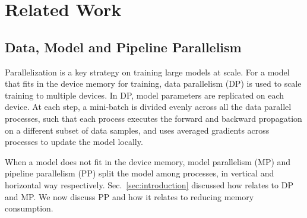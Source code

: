 \section{Related Work}
\label{sec:related-work}
\subsection{Data, Model and Pipeline Parallelism}
Parallelization is a key strategy on training large models at scale. For a model that fits in the device memory for training, data parallelism (DP) is used to scale training to multiple devices. In DP, model parameters are replicated on each device. At each step, a mini-batch is divided evenly across all the data parallel processes, such that each process executes the forward and backward propagation on a different subset of data samples, and uses averaged gradients across processes to update the model locally.  

When a model does not fit in the device memory, model parallelism (MP) \cite{DBLP:journals/corr/mesh-tensor, megatronlm} and pipeline parallelism (PP) \cite{GPipe, DBLP:journals/corr/pipedream} split the model among processes, in vertical and horizontal way respectively. Sec.~\ref{sec:introduction} discussed how \name relates to DP and MP. We now discuss PP and how it relates to reducing memory consumption.

